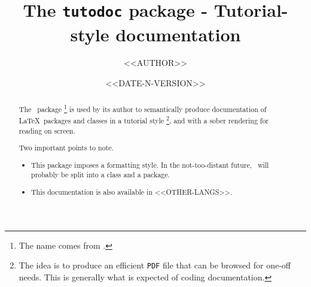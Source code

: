 \documentclass[10pt, a4paper]{article}
\begin{document}
\title{The \texttt{tutodoc} package - Tutorial-style documentation}
\author{<<AUTHOR>>}
\date{<<DATE-N-VERSION>>}

\maketitle

\begin{abstract}
    The \thispack\ package
    \footnote{
        The name comes from .
    }
    is used by its author to semantically produce documentation of \LaTeX\ packages and classes in a tutorial style
    \footnote{
        The idea is to produce an efficient \texttt{PDF} file that can be browsed for one-off needs. This is generally what is expected of coding documentation.
    },
    and with a sober rendering for reading on screen.

    \medskip

    Two important points to note.
    \begin{itemize}
        \item This package imposes a formatting style. In the not-too-distant future, \thispack\ will probably be split into a class and a package.

        \item This documentation is also available in <<OTHER-LANGS>>.
    \end{itemize}
\end{abstract}
\end{document}
